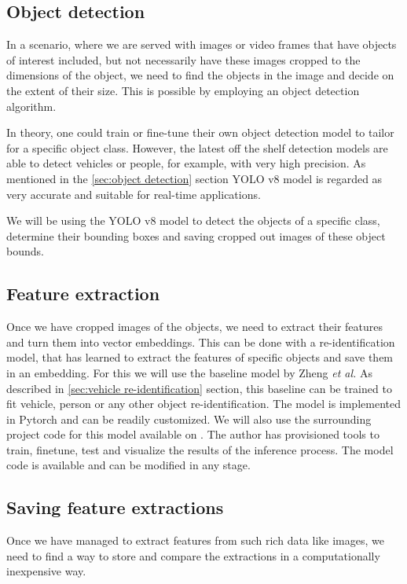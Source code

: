 \documentclass[conference]{IEEEtran} %
\begin{document}
	\subsection{Object detection}
	
		In a scenario, where we are served with images or video frames that have objects of interest included, but not necessarily have these images cropped to the dimensions of the object, we need to find the objects in the image and decide on the extent of their size. This is possible by employing an object detection algorithm.
		 
		In theory, one could train or fine-tune their own object detection model to tailor for a specific object class. However, the latest off the shelf detection models are able to detect vehicles or people, for example, with very high precision. As mentioned in the \ref{sec:object detection} section YOLO v8 model is regarded as very accurate and suitable for real-time applications.
		 
		We will be using the YOLO v8 model to detect the objects of a specific class, determine their bounding boxes and saving cropped out images of these object bounds.
	
	\subsection{Feature extraction}
	
		Once we have cropped images of the objects, we need to extract their features and turn them into vector embeddings. This can be done with a re-identification model, that has learned to extract the features of specific objects and save them in an embedding. For this we will use the baseline model by Zheng \textit{et al.} As described in \ref{sec:vehicle re-identification} section, this baseline can be trained to fit vehicle, person or any other object re-identification. The model is implemented in Pytorch and can be readily customized. We will also use the surrounding project code for this model available on \cite{layumiGithub}. The author has provisioned tools to train, finetune, test and visualize the results of the inference process. The model code is available and can be modified in any stage.
		
	\subsection{Saving feature extractions}
		
		Once we have managed to extract features from such rich data like images, we need to find a way to store and compare the extractions in a computationally inexpensive way. 
		
\end{document}
